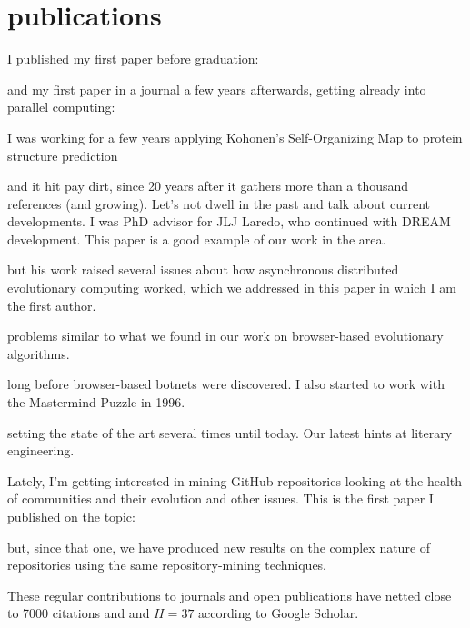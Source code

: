 \documentclass[]{friggeri-jj-cv}
\begin{document}
\section{publications}

I published my first paper before graduation:

\cite{merelo88}
and my first paper in a journal a few years
afterwards, getting already into parallel computing:

\cite{parallel90}
I was working for a few years applying Kohonen's Self-Organizing Map to protein structure prediction

\cite{jjproteng} 
and it hit pay dirt, since 20 years after it gathers more than a
thousand references (and growing). Let's not dwell in the past
and talk about current developments. I was PhD advisor for JLJ Laredo,
who continued with DREAM development. This paper is a good example of
our work in the area.

\cite{evag:gpem}
but his work raised several issues about how asynchronous distributed
evolutionary computing worked, which we addressed in this paper in
which I am the first author.

\cite{jj:2008:PPSN}
problems similar to what we found in our work on browser-based
evolutionary algorithms.

\cite{agajaj}
long before browser-based botnets were discovered. I also started to
work with the Mastermind Puzzle in 1996.

\cite{jj-ppsn96}
setting the state of the art several times until today. Our latest hints at
literary engineering.

\cite{2014arXiv1403.3084G}

Lately, I'm getting interested in mining GitHub repositories looking
at the health of communities and their evolution and other
issues. This is the first paper I published on the topic:

\cite{2016arXiv160107862M}

but, since that one, we have produced new results on the complex
nature of repositories using the same repository-mining techniques.

These regular contributions to journals and open publications have
netted close to 7000 citations and and $H=37$ according to Google Scholar.

\end{document}
